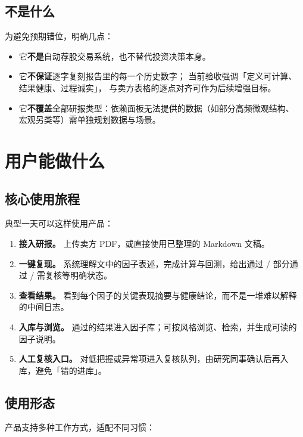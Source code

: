 \documentclass[UTF8,a4paper,11pt]{ctexart}
\begin{document}
\subsection{不是什么}

为避免预期错位，明确几点：

\begin{itemize}
  \item 它\textbf{不是}自动荐股交易系统，也不替代投资决策本身。
  \item 它\textbf{不保证}逐字复刻报告里的每一个历史数字；
        当前验收强调「定义可计算、结果健康、过程诚实」，
        与卖方表格的逐点对齐可作为后续增强目标。
  \item 它\textbf{不覆盖}全部研报类型：依赖面板无法提供的数据（如部分高频微观结构、
        宏观另类等）需单独规划数据与场景。
\end{itemize}

\section{用户能做什么}

\subsection{核心使用旅程}

典型一天可以这样使用产品：

\begin{enumerate}
  \item \textbf{接入研报。} 上传卖方 PDF，或直接使用已整理的 Markdown 文稿。
  \item \textbf{一键复现。} 系统理解文中的因子表述，完成计算与回测，给出通过 / 部分通过 / 需复核等明确状态。
  \item \textbf{查看结果。} 看到每个因子的关键表现摘要与健康结论，而不是一堆难以解释的中间日志。
  \item \textbf{入库与浏览。} 通过的结果进入因子库；可按风格浏览、检索，并生成可读的因子说明。
  \item \textbf{人工复核入口。} 对低把握或异常项进入复核队列，由研究同事确认后再入库，避免「错的进库」。
\end{enumerate}

\subsection{使用形态}

产品支持多种工作方式，适配不同习惯：
\end{document}
